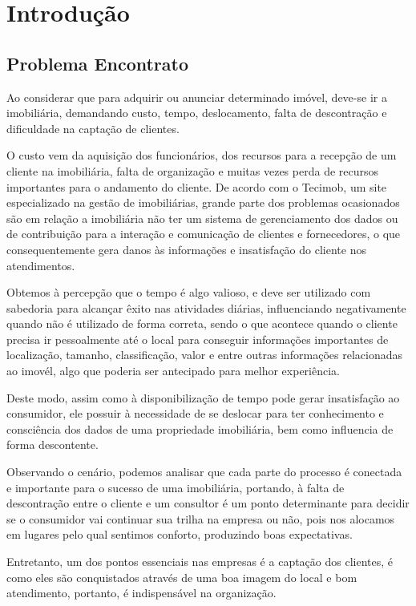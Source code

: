 \documentclass[../main.tex]{subfiles}
\begin{document}
\section{Introdução}    
\subsection{Problema Encontrato}
Ao considerar que para adquirir ou anunciar determinado imóvel, deve-se ir a imobiliária, demandando custo, tempo, deslocamento, falta de descontração e dificuldade na captação de clientes. 

O custo vem da aquisição dos funcionários, dos recursos para a recepção de um cliente na imobiliária, falta de organização e muitas vezes perda de recursos importantes para o andamento do cliente. De acordo com o Tecimob, um site especializado na gestão de imobiliárias, grande parte dos problemas ocasionados são em relação a imobiliária não ter um sistema de gerenciamento dos dados ou de contribuição para a interação e comunicação de clientes e fornecedores, o que consequentemente gera danos às informações e insatisfação do cliente nos atendimentos. 

Obtemos à percepção que o tempo é algo valioso, e deve ser utilizado com sabedoria para alcançar êxito nas atividades diárias, influenciando negativamente quando não é utilizado de forma correta, sendo o que acontece quando o cliente precisa ir pessoalmente até o local para conseguir informações importantes de localização, tamanho, classificação, valor e entre outras informações relacionadas ao imovél, algo que poderia ser antecipado para melhor experiência. 

Deste modo, assim como à disponibilização de tempo pode gerar insatisfação ao consumidor, ele possuir à necessidade de se deslocar para ter conhecimento e consciência dos dados de uma propriedade imobiliária, bem como influencia de forma descontente.  

Observando o cenário, podemos analisar que cada parte do processo é conectada e importante para o sucesso de uma imobiliária, portando, à falta de descontração entre o cliente e um consultor é um ponto determinante para decidir se o consumidor vai continuar sua trilha na empresa ou não, pois nos alocamos em lugares pelo qual sentimos conforto, produzindo boas expectativas. 

Entretanto, um dos pontos essenciais nas empresas é a captação dos clientes, é como eles são conquistados através de uma boa imagem do local e bom atendimento, portanto, é indispensável na organização. 
\end{document}
